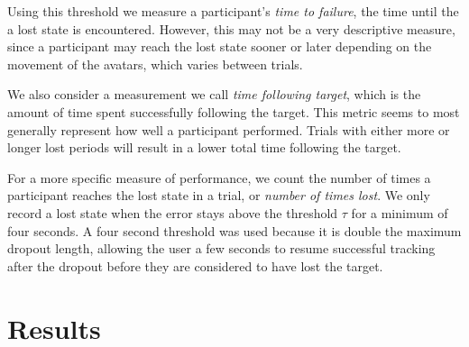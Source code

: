 \documentclass{acmsiggraph}                     %
\begin{document}
Using this threshold we measure a participant's \emph{time to failure}, the time until the a lost state is encountered.  However, this may not be a very descriptive measure, since a participant may reach the lost state sooner or later depending on the movement of the avatars, which varies between trials.

We also consider a measurement we call \emph{time following target}, which is the amount of time spent successfully following the target.  This metric seems to most generally represent how well a participant performed.  Trials with either more or longer lost periods will result in a lower total time following the target.

For a more specific measure of performance, we count the number of times a participant reaches the lost state in a trial, or  \emph{number of times lost}.  We only record a lost state when the error stays above the threshold $\tau$ for a minimum of four seconds.  A four second threshold was used because it is double the maximum dropout length, allowing the user a few seconds to resume successful tracking after the dropout before they are considered to have lost the target.



\section{Results}





\end{document}
